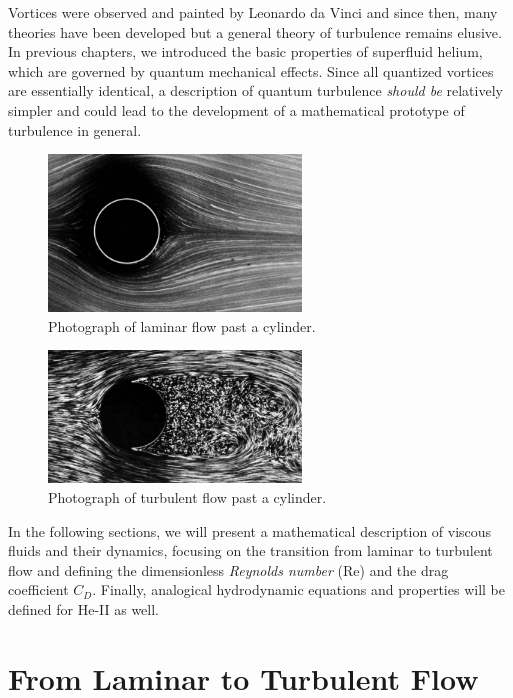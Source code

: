 Vortices were observed and painted by Leonardo da Vinci and since then, many theories have been developed but a general theory of turbulence remains elusive. In previous chapters, we introduced the basic properties of superfluid helium, which are governed by quantum mechanical effects. Since all quantized vortices are essentially identical, a description of quantum turbulence \textit{should be} relatively simpler and could lead to the development of a mathematical prototype of turbulence in general.

\begin{figure}[h]
\centering
\includegraphics[width=0.6\textwidth]{graphics/laminar}
\caption{Photograph of laminar flow past a cylinder.}
\end{figure}

\begin{figure}[h]
\centering
\includegraphics[width=0.6\textwidth]{graphics/turbulent}
\caption{Photograph of turbulent flow past a cylinder.}
\end{figure}

In the following sections, we will present a mathematical description of viscous fluids and their dynamics, focusing on the transition from laminar to turbulent flow and defining the dimensionless \textit{Reynolds number} (Re) and the drag coefficient $ C_D $. Finally, analogical hydrodynamic equations and properties will be defined for He-II as well.

\newpage

\section{From Laminar to Turbulent Flow}

